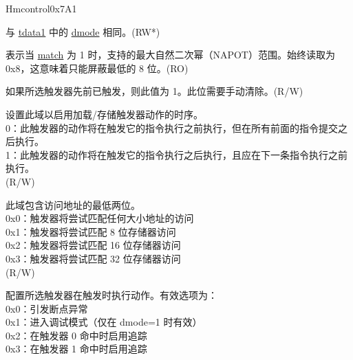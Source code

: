 \begin{register}{H}{mcontrol}{0x7A1}\label{regdesc:MCONTROL}
%
%
%
%
%
%
%
%
%
%
%
%
%
%
%
%
\regnewline%
\begin{regdesc}\begin{reglist}
\label{fielddesc:MCONTROLDMODE}\item [dmode] 与 \hyperref[regdesc:TDATA1]{tdata1} 中的 \hyperref[fielddesc:TDATA1DMODE]{dmode} 相同。(RW*)
\label{fielddesc:MCONTROLMASKMAX}\item [maskmax]
表示当 \hyperref[fielddesc:MCONTROLMATCH]{match} 为 1 时，支持的最大自然二次幂（NAPOT）范围。始终读取为 0x8，这意味着只能屏蔽最低的 8 位。(RO)
\label{fielddesc:MCONTROLHIT}\item [hit] 如果所选触发器先前已触发，则此值为 1。此位需要手动清除。(R/W)
\label{fielddesc:MCONTROLTIMING}\item [timing] 设置此域以启用加载/存储触发器动作的时序。\\
0：此触发器的动作将在触发它的指令执行之前执行，但在所有前面的指令提交之后执行。\\
1：此触发器的动作将在触发它的指令执行之后执行，且应在下一条指令执行之前执行。\\
(R/W)
\label{fielddesc:MCONTROLSIZELO}\item [sizelo] 此域包含访问地址的最低两位。\\
0x0：触发器将尝试匹配任何大小地址的访问\\
0x1：触发器将尝试匹配 8 位存储器访问\\
0x2：触发器将尝试匹配 16 位存储器访问\\
0x3：触发器将尝试匹配 32 位存储器访问\\
(R/W)
\label{fielddesc:MCONTROLACTION}\item [action] 配置所选触发器在触发时执行动作。有效选项为：\\
0x0：引发断点异常\\
0x1：进入调试模式（仅在 dmode=1 时有效）\\
0x2：在触发器 0 命中时启用追踪\\
0x3：在触发器 1 命中时启用追踪\\

\end{reglist}
\end{regdesc}
\end{register}
